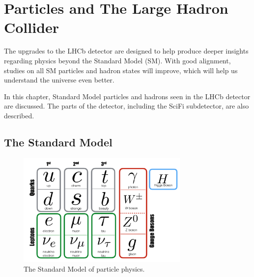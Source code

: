 \chapter{Particles and The Large Hadron Collider}
\label{sec:particleslhc}

The upgrades to the LHCb detector are designed to help produce deeper insights regarding physics beyond the Standard Model (SM). With good alignment, studies on all SM particles and hadron states will improve, which will help us understand the universe even better.

In this chapter, Standard Model particles and hadrons seen in the LHCb detector are discussed. The parts of the detector, including the SciFi subdetector, are also described.



\section{The Standard Model}
\label{sec:sm}

\begin{figure}
  \centering
  \includegraphics[width=0.75\textwidth]{plots/SM_2018.png}
  \caption{The Standard Model of particle physics\cite{standard2018}.}
  \label{fig:sm2018}
\end{figure}

